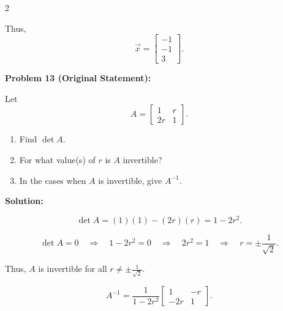 \documentclass[8pt]{extarticle}
\begin{document}
\begin{multicols}{2}
\begin{tcolorbox}[title=Problem 12 — Original Statement and Solution]
Thus,
\[
\boxed{
\vec{x} =
\begin{bmatrix}
-1\\
-1\\
3
\end{bmatrix}
}.
\]
\end{tcolorbox}

\begin{tcolorbox}[title=Problem 13 — Original Statement and Solution]
\noindent
\textbf{Problem 13 (Original Statement):}  

Let
\[
A =
\begin{bmatrix}
1 & r\\
2r & 1
\end{bmatrix}.
\]

\begin{enumerate}
\item[(a)] Find \(\det A\).
\item[(b)] For what value(s) of \(r\) is \(A\) invertible?
\item[(c)] In the cases when \(A\) is invertible, give \(A^{-1}\).
\end{enumerate}

\bigskip
\noindent
\textbf{Solution:}

\[
\det A = (1)(1) - (2r)(r) = 1 - 2r^{2}.
\]

\[
\det A = 0 \quad \Rightarrow \quad 1 - 2r^{2} = 0
\quad\Rightarrow\quad 2r^{2} = 1
\quad\Rightarrow\quad r = \pm \frac{1}{\sqrt{2}}.
\]

Thus, \(A\) is invertible for all \(r \neq \pm \frac{1}{\sqrt{2}}\).

\bigskip
\[
A^{-1}
= \frac{1}{1 - 2r^{2}}
\begin{bmatrix}
1 & -r\\
-2r & 1
\end{bmatrix}.
\]
\end{tcolorbox}

\end{multicols}
\end{document}
